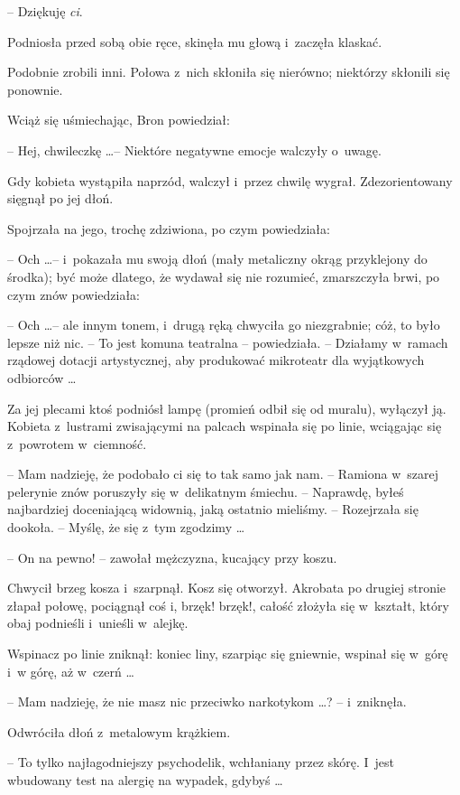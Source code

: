 \documentclass[oneside,polish,11pt,rmheadings]{mwbk}
\begin{document}
-- Dziękuję \textit{ci}. 

Podniosła przed sobą obie ręce, skinęła mu głową i~zaczęła klaskać. 

Podobnie zrobili inni. Połowa z~nich skłoniła się nierówno; niektórzy skłonili się ponownie. 

Wciąż się uśmiechając, Bron powiedział: 

-- Hej, chwileczkę \ldots  -- Niektóre negatywne emocje walczyły o~uwagę. 

Gdy kobieta wystąpiła naprzód, walczył i~przez chwilę wygrał.  Zdezorientowany sięgnął po jej dłoń. 

Spojrzała na jego, trochę zdziwiona, po czym powiedziała: 

-- Och \ldots -- i~pokazała mu swoją dłoń (mały metaliczny okrąg przyklejony do środka); być może dlatego, że wydawał się nie rozumieć, zmarszczyła brwi, po czym znów powiedziała: 

-- Och \ldots -- ale innym tonem, i~drugą ręką chwyciła go niezgrabnie; cóż, to było lepsze niż nic.  -- To jest komuna teatralna -- powiedziała. -- Działamy w~ramach rządowej dotacji artystycznej, aby produkować mikroteatr dla wyjątkowych odbiorców \ldots  

Za jej plecami ktoś podniósł lampę (promień odbił się od muralu), wyłączył ją.  Kobieta z~lustrami zwisającymi na palcach wspinała się po linie, wciągając się z~powrotem w~ciemność. 

-- Mam nadzieję, że podobało ci się to tak samo jak nam. -- Ramiona w~szarej pelerynie znów poruszyły się w~delikatnym śmiechu. -- Naprawdę, byłeś najbardziej doceniającą widownią, jaką ostatnio mieliśmy. -- Rozejrzała się dookoła. -- Myślę, że się z~tym zgodzimy \ldots  

-- On na pewno! -- zawołał mężczyzna, kucający przy koszu. 

Chwycił brzeg kosza i~szarpnął. Kosz się otworzył. Akrobata po drugiej stronie złapał połowę, pociągnął coś i, brzęk! brzęk!, całość złożyła się w~kształt, który obaj podnieśli i~unieśli w~alejkę.  

Wspinacz po linie zniknął: koniec liny, szarpiąc się gniewnie, wspinał się w~górę i~w górę, aż w~czerń \ldots  

-- Mam nadzieję, że nie masz nic przeciwko narkotykom \ldots ? -- i~zniknęła. 

Odwróciła dłoń z~metalowym krążkiem. 

-- To tylko najłagodniejszy psychodelik, wchłaniany przez skórę. I~jest wbudowany test na alergię na wypadek, gdybyś \ldots  
\end{document}

